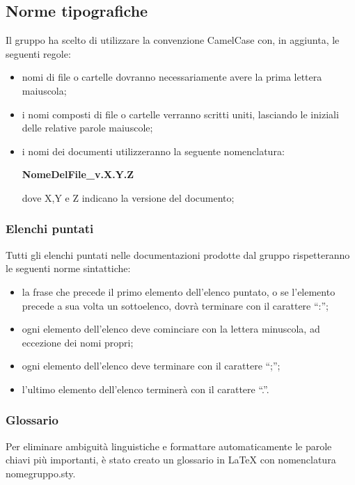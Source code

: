 \subsection{Norme tipografiche}
Il gruppo ha scelto di utilizzare la convenzione CamelCase con, in aggiunta, le seguenti regole:
\begin{itemize}
	\item nomi di file o cartelle dovranno necessariamente avere la prima lettera maiuscola;
	\item i nomi composti di file o cartelle verranno scritti uniti, lasciando le iniziali delle relative parole maiuscole;
	\item i nomi dei documenti utilizzeranno la seguente nomenclatura:
	\begin{center}
	\textbf{NomeDelFile\_v.X.Y.Z}
	\end{center}
	dove X,Y e Z indicano la versione del documento;
\end{itemize}

\subsubsection{Elenchi puntati}
Tutti gli elenchi puntati nelle documentazioni prodotte dal gruppo {\Gruppo} rispetteranno le seguenti norme sintattiche:
\begin{itemize}
	\item la frase che precede il primo elemento dell’elenco puntato, o se l’elemento precede a sua volta un sottoelenco, dovrà terminare con il carattere “:”;
	\item ogni elemento dell’elenco deve cominciare con la lettera minuscola, ad eccezione dei nomi propri;
	\item ogni elemento dell’elenco deve terminare con il carattere “;”;
	\item l’ultimo elemento dell’elenco terminerà con il carattere “.”.
\end{itemize}

\subsubsection{Glossario}
Per eliminare ambiguità linguistiche e formattare automaticamente le parole chiavi più importanti, è stato creato un glossario in \LaTeX{} con nomenclatura nomegruppo.sty.


